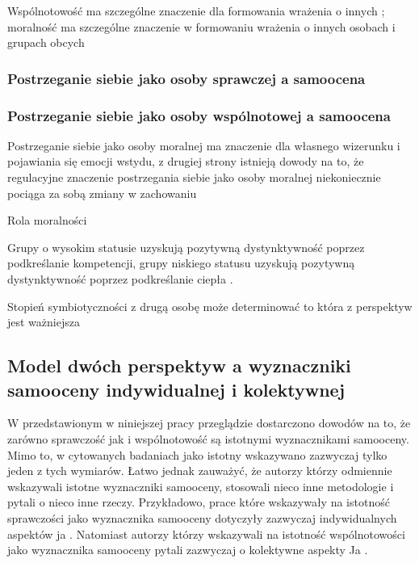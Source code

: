 \documentclass[man]{apa6}
\begin{document}
Wspólnotowość ma szczególne znaczenie dla formowania wrażenia o innych \parencite{wojciszke1998dominance}; moralność ma szczególne znaczenie w formowaniu wrażenia o innych osobach \parencite{brambilla2011looking, goodwin2014moral} i grupach obcych \parencite{brambilla2012you}

\subsubsection{Postrzeganie siebie jako osoby sprawczej a samoocena}

\subsubsection{Postrzeganie siebie jako osoby wspólnotowej a samoocena}

Postrzeganie siebie jako osoby moralnej ma znaczenie dla własnego wizerunku i pojawiania się emocji wstydu\parencite{gausel2011concern}, z drugiej strony istnieją dowody na to, że regulacyjne znaczenie postrzegania siebie jako osoby moralnej niekoniecznie pociąga za sobą zmiany w zachowaniu \parencite{merritt2010moral, monin2001moral, iyer2012sugaring}

Rola moralności \parencite{ellemers2008better, ellemers2012morality, leach2007group, pagliaro2011sharing}

Grupy o wysokim statusie uzyskują pozytywną dystynktywność poprzez podkreślanie kompetencji, grupy niskiego statusu uzyskują pozytywną dystynktywność poprzez podkreślanie ciepła \parencite{oldmeadow2010social}.

Stopień symbiotyczności z drugą osobę może determinować to która z perspektyw jest ważniejsza \parencite{wojciszke2008primacy}

\newpage
\subsection{Model dwóch perspektyw a wyznaczniki samooceny indywidualnej i kolektywnej}

W przedstawionym w niniejszej pracy przeglądzie dostarczono dowodów na to, że zarówno sprawczość jak i wspólnotowość są istotnymi wyznacznikami samooceny. Mimo to, w cytowanych badaniach jako istotny wskazywano zazwyczaj tylko jeden z tych wymiarów. Łatwo jednak zauważyć, że autorzy którzy odmiennie wskazywali istotne wyznaczniki samooceny, stosowali nieco inne metodologie i pytali o nieco inne rzeczy. Przykładowo, prace które wskazywały na istotność sprawczości jako wyznacznika samooceny dotyczyły zazwyczaj indywidualnych aspektów ja \parencite[np., ][]{wojciszke2011self}. Natomiast autorzy którzy wskazywali na istotność wspólnotowości jako wyznacznika samooceny pytali zazwyczaj o kolektywne aspekty Ja \parencite[np., ][]{leach2007group, ellemers2008better}. \\
\end{document}
